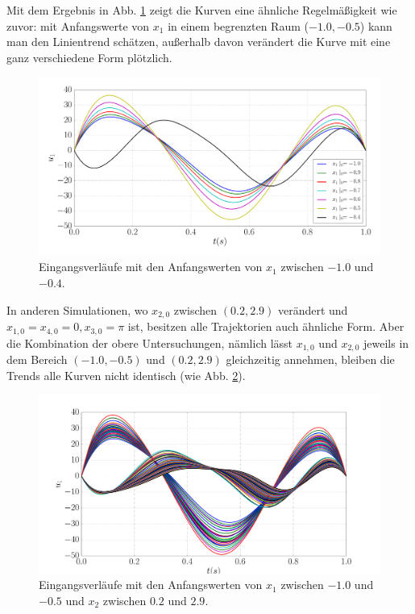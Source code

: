 Mit dem Ergebnis in Abb. \ref{fig:Inverses_Pendel_Asy_x1_-10_-04_u} zeigt die Kurven eine ähnliche Regelmäßigkeit wie zuvor: mit Anfangswerte von $x_{1}$ in einem begrenzten Raum ($-1.0,-0.5$) kann man den Linientrend schätzen, außerhalb davon verändert die Kurve mit eine ganz verschiedene Form plötzlich. 
\begin{figure}[!h]
	\centering
	\includegraphics[width=0.95\linewidth]{bild/30_32/Inverses_Pendel_Asy_x1_-10_-04_u.pdf}%
	\caption{Eingangsverläufe mit den Anfangswerten von $x_{1}$ zwischen $-1.0$ und $-0.4$.}
	\label{fig:Inverses_Pendel_Asy_x1_-10_-04_u}
\end{figure} 

 In anderen Simulationen, wo $x_{2,0}$ zwischen $(0.2,2.9)$ verändert und $x_{1,0}=x_{4,0}=0, x_{3,0}=\pi$ ist, besitzen alle Trajektorien auch ähnliche Form. Aber die Kombination der obere Untersuchungen, nämlich lässt $x_{1,0}$ und $x_{2,0}$ jeweils in dem Bereich $(-1.0,-0.5)$ und $(0.2,2.9)$ gleichzeitig annehmen, bleiben die Trends alle Kurven nicht identisch (wie Abb. \ref{fig:Inverses_Pendel_Asy_x1_-1_-05_x2-02_30_u}).
\begin{figure}[!h]
	\centering
	\includegraphics[width=0.95\linewidth]{bild/30_32/Inverses_Pendel_Asy_x1_-1_-05_x2-02_30_u.pdf}%
	\caption{Eingangsverläufe mit den Anfangswerten von $x_{1}$ zwischen $-1.0$ und $-0.5$ und $x_{2}$ zwischen $0.2$ und $2.9$.}
	\label{fig:Inverses_Pendel_Asy_x1_-1_-05_x2-02_30_u}
\end{figure} 

